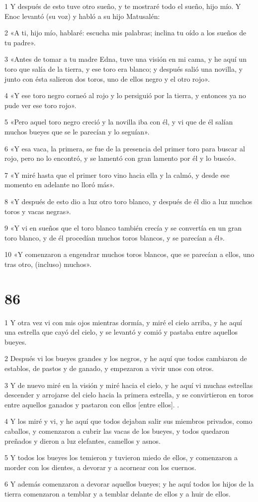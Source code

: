 \par 1 Y después de esto tuve otro sueño, y te mostraré todo el sueño, hijo mío. Y Enoc levantó (su voz) y habló a su hijo Matusalén:
\par 2 «A ti, hijo mío, hablaré: escucha mis palabras; inclina tu oído a los sueños de tu padre».
\par 3 «Antes de tomar a tu madre Edna, tuve una visión en mi cama, y ​​he aquí un toro que salía de la tierra, y ese toro era blanco; y después salió una novilla, y junto con ésta salieron dos toros, uno de ellos negro y el otro rojo».
\par 4 «Y ese toro negro corneó al rojo y lo persiguió por la tierra, y entonces ya no pude ver ese toro rojo».
\par 5 «Pero aquel toro negro creció y la novilla iba con él, y vi que de él salían muchos bueyes que se le parecían y lo seguían».
\par 6 «Y esa vaca, la primera, se fue de la presencia del primer toro para buscar al rojo, pero no lo encontró, y se lamentó con gran lamento por él y lo buscó».
\par 7 «Y miré hasta que el primer toro vino hacia ella y la calmó, y desde ese momento en adelante no lloró más».
\par 8 «Y después de esto dio a luz otro toro blanco, y después de él dio a luz muchos toros y vacas negras».
\par 9 «Y vi en sueños que el toro blanco también crecía y se convertía en un gran toro blanco, y de él procedían muchos toros blancos, y se parecían a él».
\par 10 «Y comenzaron a engendrar muchos toros blancos, que se parecían a ellos, uno tras otro, (incluso) muchos».

\chapter{86}

\par 1 Y otra vez vi con mis ojos mientras dormía, y miré el cielo arriba, y he aquí una estrella que cayó del cielo, y se levantó y comió y pastaba entre aquellos bueyes.
\par 2 Después vi los bueyes grandes y los negros, y he aquí que todos cambiaron de establos, de pastos y de ganado, y empezaron a vivir unos con otros.
\par 3 Y de nuevo miré en la visión y miré hacia el cielo, y he aquí vi muchas estrellas descender y arrojarse del cielo hacia la primera estrella, y se convirtieron en toros entre aquellos ganados y pastaron con ellos [entre ellos]. .
\par 4 Y los miré y vi, y he aquí que todos dejaban salir sus miembros privados, como caballos, y comenzaron a cubrir las vacas de los bueyes, y todos quedaron preñados y dieron a luz elefantes, camellos y asnos.
\par 5 Y todos los bueyes los temieron y tuvieron miedo de ellos, y comenzaron a morder con los dientes, a devorar y a acornear con los cuernos.
\par 6 Y además comenzaron a devorar aquellos bueyes; y he aquí todos los hijos de la tierra comenzaron a temblar y a temblar delante de ellos y a huir de ellos.

